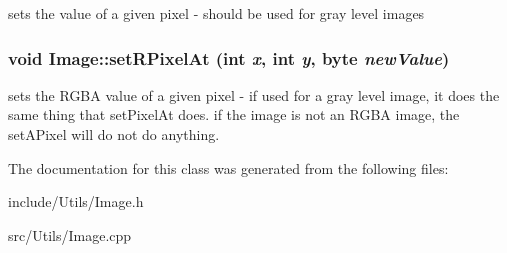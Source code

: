 \label{classCartWheel_1_1Util_1_1Image_a28ecf729560e39b56c1dd44b3d152b79}
sets the value of a given pixel -\/ should be used for gray level images \hypertarget{classCartWheel_1_1Util_1_1Image_a0fac12ef4b19700890c191bec1c29a03}{
\subsubsection[{setRPixelAt}]{\setlength{\rightskip}{0pt plus 5cm}void Image::setRPixelAt (int {\em x}, \/  int {\em y}, \/  byte {\em newValue})}}
\label{classCartWheel_1_1Util_1_1Image_a0fac12ef4b19700890c191bec1c29a03}
sets the RGBA value of a given pixel -\/ if used for a gray level image, it does the same thing that setPixelAt does. if the image is not an RGBA image, the setAPixel will do not do anything. 

The documentation for this class was generated from the following files:\begin{DoxyCompactItemize}
\item 
include/Utils/Image.h\item 
src/Utils/Image.cpp\end{DoxyCompactItemize}

